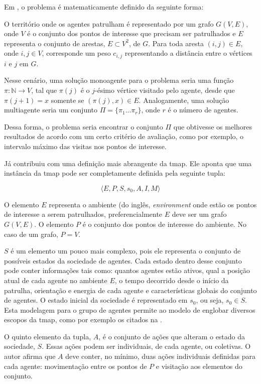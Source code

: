 Em \citep{Chevaleyre:2004:TAM:1018411.1019013}, o problema é matematicamente 
definido da seguinte forma:

O território onde os agentes patrulham é representado por um grafo $G(V,E)$, 
onde $V$ é o conjunto dos pontos de interesse que precisam ser patrulhados e 
$E$ representa o conjunto de arestas, $E \subset V^{2}$, de $G$. Para toda 
aresta $(i,j) \in E$, onde $i,j \in V$, corresponde um peso $c_{i,j}$ 
representando a distância entre o vértices $i$ e $j$ em $G$. 

Nesse cenário, uma solução monoagente para o problema seria uma função 
$ \pi : \mathbb{N} \longrightarrow V$, tal que $ \pi(j)$ 
é o $j$-ésimo vértice visitado pelo agente, desde que 
$ \pi(j+1) = x $ somente se $ (\pi(j), x) \in E $. Analogamente, 
uma solução multiagente seria um conjunto $ \Pi = \{ \pi_{1} ... \pi_{r} \}$, 
onde $r$ é o número de agentes.

Dessa forma, o problema seria encontrar o conjunto $ \Pi $ que obtivesse os 
melhores resultados de acordo com um certo critério de avaliação, como por 
exemplo, o intervalo máximo das visitas nos pontos de interesse.

Já \citep{sampaiophd} contribuiu com uma definição mais abrangente da \ac{tmap}. 
Ele aponta que uma instância da \ac{tmap} pode ser completamente definida pela 
seguinte tupla: 

$$ \langle E, P, S, s_{0}, A, I, M \rangle $$

O elemento $E$ representa o ambiente (do inglês, \textit{environment} onde estão 
os pontos de interesse a serem patrulhados, preferencialmente $E$ deve ser um 
grafo $G(V,E)$. O elemento $P$ é o conjunto dos pontos de interesse do ambiente. 
No caso de um grafo, $P = V$.

$S$ é um elemento um pouco mais complexo, pois ele representa o conjunto de 
possíveis estados da sociedade de agentes. Cada estado dentro desse conjunto 
pode conter informações tais como: quantos agentes estão ativos, qual a posição 
atual de cada agente no ambiente $E$, o tempo decorrido desde o início da 
patrulha, orientação e energia de cada agente e características globais do 
conjunto de agentes. O estado inicial da sociedade é representado em $s_{0}$, ou 
seja, $s_{0} \in S$. Esta modelagem para o grupo de agentes permite ao modelo de 
\citep{sampaiophd} englobar diversos escopos da \ac{tmap}, como por exemplo os 
citados na .

O quinto elemento da tupla, $A$, é o conjunto de ações que alteram o estado da 
sociedade, $S$. Essas ações podem ser individuais, de cada agente, ou coletivas. 
O autor afirma que $A$ deve conter, no mínimo, duas ações individuais definidas 
para cada agente: movimentação entre os pontos de $P$ e visitação aos elementos 
do conjunto.

